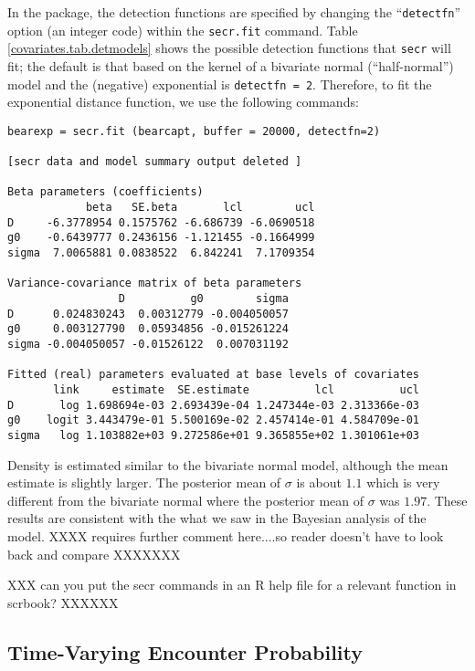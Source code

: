 In the \secr package, the detection functions are specified
by changing the ``\mbox{\tt detectfn}'' option (an integer code)
within the \mbox{\tt secr.fit} command.  Table
\ref{covariates.tab.detmodels} shows the possible detection functions
that \mbox{\tt secr} will fit; the default is that based on the kernel
of a bivariate normal 
(``half-normal'') model and the
(negative) exponential is \mbox{\tt detectfn = 2}. Therefore, to fit the
exponential distance function, we use the following commands:

{\small
\begin{verbatim}
bearexp = secr.fit (bearcapt, buffer = 20000, detectfn=2)

[secr data and model summary output deleted ]

Beta parameters (coefficients) 
            beta   SE.beta       lcl        ucl
D     -6.3778954 0.1575762 -6.686739 -6.0690518
g0    -0.6439777 0.2436156 -1.121455 -0.1664999
sigma  7.0065881 0.0838522  6.842241  7.1709354

Variance-covariance matrix of beta parameters 
                 D          g0        sigma
D      0.024830243  0.00312779 -0.004050057
g0     0.003127790  0.05934856 -0.015261224
sigma -0.004050057 -0.01526122  0.007031192

Fitted (real) parameters evaluated at base levels of covariates 
       link     estimate  SE.estimate          lcl          ucl
D       log 1.698694e-03 2.693439e-04 1.247344e-03 2.313366e-03
g0    logit 3.443479e-01 5.500169e-02 2.457414e-01 4.584709e-01
sigma   log 1.103882e+03 9.272586e+01 9.365855e+02 1.301061e+03
\end{verbatim}
}

Density is estimated similar to the bivariate normal model, 
although the mean
estimate is slightly larger. The 
posterior mean of 
$\sigma$ is about $1.1$
 which is very different from the bivariate normal where the
posterior mean of $\sigma$ was $1.97$.
These results are consistent with the what we saw in the Bayesian
analysis of the model. XXXX requires further comment here....so reader
doesn't have to look back and compare XXXXXXX

XXX can you put the secr commands in an R help file for a relevant
function in scrbook? XXXXXX




\subsection{Time-Varying Encounter Probability}

